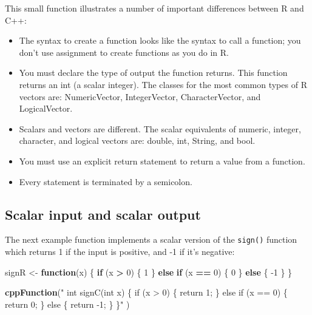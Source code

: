\documentclass[
]{krantz}
\makeatletter
\newenvironment{Shaded}{\begin{snugshade}}{\end{snugshade}}
\newcommand{\ControlFlowTok}[1]{\textcolor[rgb]{0.27,0.27,0.27}{\textbf{#1}}}
\newcommand{\DecValTok}[1]{\textcolor[rgb]{0.06,0.06,0.06}{#1}}
\newcommand{\KeywordTok}[1]{\textcolor[rgb]{0.27,0.27,0.27}{\textbf{#1}}}
\newcommand{\NormalTok}[1]{#1}
\newcommand{\OperatorTok}[1]{\textcolor[rgb]{0.43,0.43,0.43}{\textbf{#1}}}
\newcommand{\StringTok}[1]{\textcolor[rgb]{0.5,0.5,0.5}{#1}}
\providecommand{\tightlist}{%
  \setlength{\itemsep}{0pt}\setlength{\parskip}{0pt}}
\newenvironment{kframe}{%
\medskip{}
\setlength{\fboxsep}{.8em}
 \def\at@end@of@kframe{}%
 \ifinner\ifhmode%
  \def\at@end@of@kframe{\end{minipage}}%
  \begin{minipage}{\columnwidth}%
 \fi\fi%
 \def\FrameCommand##1{\hskip\@totalleftmargin \hskip-\fboxsep
 \colorbox{shadecolor}{##1}\hskip-\fboxsep
     \hskip-\linewidth \hskip-\@totalleftmargin \hskip\columnwidth}%
 \MakeFramed {\advance\hsize-\width
   \@totalleftmargin\z@ \linewidth\hsize
   \@setminipage}}%
 {\par\unskip\endMakeFramed%
 \at@end@of@kframe}
\renewenvironment{Shaded}{\begin{kframe}}{\end{kframe}}
\makeatother
\begin{document}
This small function illustrates a number of important differences between R and C++:

\begin{itemize}
\tightlist
\item
  The syntax to create a function looks like the syntax to call a function; you don't use assignment to create functions as you do in R.
\item
  You must declare the type of output the function returns. This function returns an int (a scalar integer). The classes for the most common types of R vectors are: NumericVector, IntegerVector, CharacterVector, and LogicalVector.
\item
  Scalars and vectors are different. The scalar equivalents of numeric, integer, character, and logical vectors are: double, int, String, and bool.
\item
  You must use an explicit return statement to return a value from a function.
\item
  Every statement is terminated by a semicolon.
\end{itemize}

\hypertarget{scalar-input-and-scalar-output}{%
\subsection{Scalar input and scalar output}\label{scalar-input-and-scalar-output}}

The next example function implements a scalar version of the \texttt{sign()} function which returns 1 if the input is positive, and -1 if it's negative:

\begin{Shaded}
\begin{Highlighting}[]
\NormalTok{signR \textless{}{-}}\StringTok{ }\ControlFlowTok{function}\NormalTok{(x) \{}
    \ControlFlowTok{if}\NormalTok{ (x }\OperatorTok{\textgreater{}}\StringTok{ }\DecValTok{0}\NormalTok{) \{}
        \DecValTok{1}
\NormalTok{    \} }\ControlFlowTok{else} \ControlFlowTok{if}\NormalTok{ (x }\OperatorTok{==}\StringTok{ }\DecValTok{0}\NormalTok{) \{}
        \DecValTok{0}
\NormalTok{    \} }\ControlFlowTok{else}\NormalTok{ \{}
        \DecValTok{{-}1}
\NormalTok{    \}}
\NormalTok{\}}

\KeywordTok{cppFunction}\NormalTok{(}\StringTok{"}
\StringTok{  int signC(int x) \{}
\StringTok{    if (x \textgreater{} 0) \{}
\StringTok{      return 1;}
\StringTok{    \} else if (x == 0) \{}
\StringTok{      return 0;}
\StringTok{    \} else \{}
\StringTok{      return {-}1;}
\StringTok{    \}}
\StringTok{  \}"}
\NormalTok{)}
\end{Highlighting}
\end{Shaded}
\end{document}

